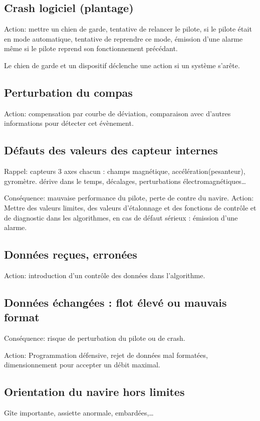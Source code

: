 \documentclass[a4paper,11pt]{report}
\begin{document}
\subsection{Crash logiciel (plantage)}

Action: mettre un chien de garde, tentative de relancer le pilote,
si le pilote était en mode automatique, tentative de reprendre ce mode,
émission d'une alarme même si le pilote reprend son fonctionnement précédant.

Le chien de garde et un dispositif déclenche une action si un système s'arête.

\subsection{Perturbation du compas}

Action: compensation par courbe de déviation, comparaison avec d'autres
informations pour détecter cet évènement.

\subsection{Défauts des valeurs des capteur internes}
Rappel: capteurs 3 axes chacun : champs magnétique, accélération(pesanteur), gyromètre.
dérive dans le temps, décalages, perturbations électromagnétiques\dots

Conséquence: mauvaise performance du pilote, perte de contre du navire.
Action: Mettre des valeurs limites, des valeurs d'étalonnage et des fonctions de contrôle et de diagnostic dans les algorithmes, en cas de défaut sérieux : émission d'une alarme.

\subsection{Données reçues, erronées}

Action: introduction d'un contrôle des données dans l'algorithme.

\subsection{Données échangées : flot élevé ou mauvais format}

Conséquence: risque de perturbation du pilote ou de crash.

Action: Programmation défensive, rejet de données mal formatées, dimensionnement
pour accepter un débit maximal.

\subsection{Orientation du navire hors limites}
Gîte importante, assiette anormale, embardées,\dots
\end{document}
